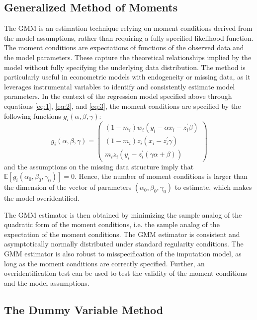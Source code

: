 \subsection{Generalized Method of Moments}
The GMM is an estimation technique relying on moment conditions derived from the model assumptions, rather than requiring a fully specified likelihood function.
The moment conditions are expectations of functions of the observed data and the model parameters.
These capture the theoretical relationships implied by the model without fully specifying the underlying data distribution.
The method is particularly useful in econometric models with endogeneity or missing data, as it leverages instrumental variables to identify and consistently estimate model parameters.
In the context of the regression model specified above through equations \eqref{eq:1}, \eqref{eq:2}, and \eqref{eq:3}, the moment conditions are specified by the following functions $g_i(\alpha, \beta, \gamma)$:
\begin{equation}\label{eq:4}
    g_i(\alpha, \beta, \gamma) = \begin{pmatrix}
        (1-m_i)w_i(y_i - \alpha x_i - z_i^{\prime}\beta) \\
        (1-m_i)z_i (x_i - z_i^{\prime} \gamma) \\
        m_i z_i (y_i - z_i^{\prime} (\gamma \alpha + \beta))
    \end{pmatrix}
\end{equation}
and the assumptions on the missing data structure imply that $\mathbb{E}[g_i(\alpha_0, \beta_0, \gamma_0)] = 0$.
Hence, the number of moment conditions is larger than the dimension of the vector of parameters $(\alpha_0, \beta_0, \gamma_0)$ to estimate, which makes the model overidentified.

The GMM estimator is then obtained by minimizing the sample analog of the quadratic form of the moment conditions, i.e. the sample analog of the expectation of the moment conditions.
The GMM estimator is consistent and asymptotically normally distributed under standard regularity conditions.
The GMM estimator is also robust to misspecification of the imputation model, as long as the moment conditions are correctly specified.
Further, an overidentification test can be used to test the validity of the moment conditions and the model assumptions.

\subsection{The Dummy Variable Method}

